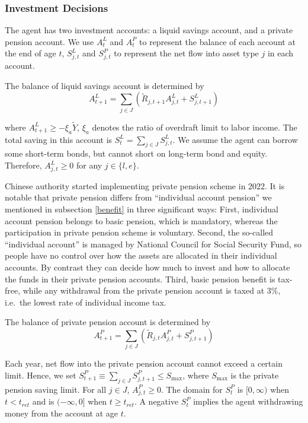 \documentclass[
  12pt,
]{article}
\begin{document}
\hypertarget{investment-decisions}{%
\subsubsection{Investment Decisions}\label{investment-decisions}}

The agent has two investment accounts: a liquid savings account, and a
private pension account. We use \(A^L_t\) and \(A^P_t\) to represent the
balance of each account at the end of age \(t\), \(S^L_{j,t}\) and
\(S^P_{j,t}\) to represent the net flow into asset type \(j\) in each
account.

The balance of liquid savings account is determined by \begin{equation}
A^L_{t+1} = \sum_{j\in J} (\tilde{R}_{j,t+1}A^L_{j,t}+S^L_{j,t+1}) 
\end{equation}

where \(A^L_{t+1} \geq -\xi_a\tilde{Y}\), \(\xi_a\) denotes the ratio of
overdraft limit to labor income. The total saving in this account is
\(S^L_t = \sum_{j \in J} S^L_{j,t}\). We assume the agent can borrow
some short-term bonds, but cannot short on long-term bond and equity.
Therefore, \(A^L_{j,t}\geq0\) for any \(j\in\{l,e\}\).

Chinese authority started implementing private pension scheme in 2022.
It is notable that private pension differs from ``individual account
pension'' we mentioned in subsection \ref{benefit} in three significant
ways: First, individual account pension belongs to basic pension, which
is mandatory, whereas the participation in private pension scheme is
voluntary. Second, the so-called ``individual account'' is managed by
National Council for Social Security Fund, so people have no control
over how the assets are allocated in their individual accounts. By
contrast they can decide how much to invest and how to allocate the
funds in their private pension accounts. Third, basic pension benefit is
tax-free, while any withdrawal from the private pension account is taxed
at 3\%, i.e.~the lowest rate of individual income tax.

The balance of private pension account is determined by \begin{equation}
A^P_{t+1} = \sum_{j\in J} (\tilde{R}_{j,t}A^P_{j,t}+S^P_{j,t+1}) 
\end{equation}

Each year, net flow into the private pension account cannot exceed a
certain limit. Hence, we set
\(S^P_{t+1}\equiv \sum_{j\in J} S^P_{j,t+1} \leq S_{\max}\), where
\(S_{\max}\) is the private pension saving limit. For all \(j \in J\),
\(A^P_{j,t} \geq 0\). The domain for \(S^P_t\) is \([0,\infty)\) when
\(t<t_{ret}\) and is \((-\infty,0]\) when \(t\geq t_{ret}\). A negative
\(S^P_t\) implies the agent withdrawing money from the account at age
\(t\).
\end{document}
